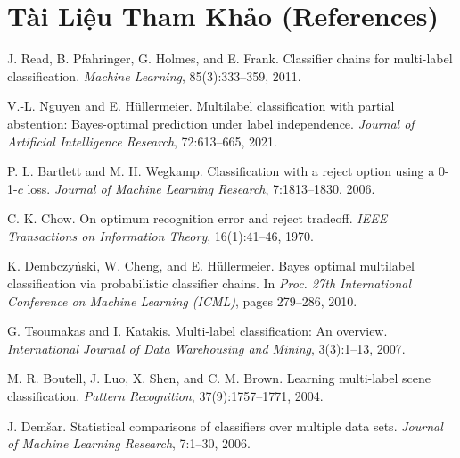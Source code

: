 \documentclass[10pt,a4paper,twoside]{article}
\begin{document}
\section*{Tài Liệu Tham Khảo (References)}
\begin{enumerate}[label={\textbf{[\arabic*]}}, leftmargin=*]
    \item J. Read, B. Pfahringer, G. Holmes, and E. Frank. Classifier chains for multi-label classification. \textit{Machine Learning}, 85(3):333--359, 2011.
    \item V.-L. Nguyen and E. Hüllermeier. Multilabel classification with partial abstention: Bayes-optimal prediction under label independence. \textit{Journal of Artificial Intelligence Research}, 72:613--665, 2021.
    \item P. L. Bartlett and M. H. Wegkamp. Classification with a reject option using a 0-1-$c$ loss. \textit{Journal of Machine Learning Research}, 7:1813--1830, 2006.
    \item C. K. Chow. On optimum recognition error and reject tradeoff. \textit{IEEE Transactions on Information Theory}, 16(1):41--46, 1970.
    \item K. Dembczy\'nski, W. Cheng, and E. Hüllermeier. Bayes optimal multilabel classification via probabilistic classifier chains. In \textit{Proc. 27th International Conference on Machine Learning (ICML)}, pages 279--286, 2010.
    \item G. Tsoumakas and I. Katakis. Multi-label classification: An overview. \textit{International Journal of Data Warehousing and Mining}, 3(3):1--13, 2007.
    \item M. R. Boutell, J. Luo, X. Shen, and C. M. Brown. Learning multi-label scene classification. \textit{Pattern Recognition}, 37(9):1757--1771, 2004.
    \item J. Dem\v{s}ar. Statistical comparisons of classifiers over multiple data sets. \textit{Journal of Machine Learning Research}, 7:1--30, 2006.
\end{enumerate}
\end{document}
